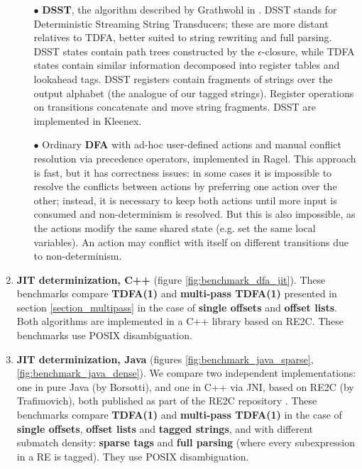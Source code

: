\documentclass[]{article}
\begin{document}
\begin{enumerate}
\begin{itemize}
\item[$\bullet$]
\textbf{DSST}, the algorithm described by Grathwohl in \cite{Gra15}.
DSST stands for Deterministic Streaming String Transducers; these are more distant relatives to TDFA,
better suited to string rewriting and full parsing.
DSST states contain path trees constructed by the $\epsilon$-closure,
while TDFA states contain similar information decomposed into register tables and lookahead tags.
DSST registers contain fragments of strings over the output alphabet (the analogue of our tagged strings).
Register operations on transitions concatenate and move string fragments.
DSST are implemented in Kleenex.
\medskip

\item[$\bullet$]
Ordinary \textbf{DFA} with ad-hoc user-defined actions
and manual conflict resolution via precedence operators,
implemented in Ragel.
This approach is fast, but it has correctness issues:
in some cases it is impossible to resolve the conflicts between actions by preferring one action over the other;
instead, it is necessary to keep both actions until more input is consumed and non-determinism is resolved.
But this is also impossible, as the actions modify the same shared state (e.g. set the same local variables).
An action may conflict with itself on different transitions due to non-determinism.
\medskip

\end{itemize}

\item
\textbf{JIT determinization, C++}
(figure \ref{fig:benchmark_dfa_jit}).
These benchmarks compare \textbf{TDFA(1)} and \textbf{multi-pass TDFA(1)} presented in section \ref{section_multipass}
in the case of \textbf{single offsets} and \textbf{offset lists}.
Both algorithms are implemented in a C++ library based on RE2C.
These benchmarks use POSIX disambiguation.
\medskip

\item
\textbf{JIT determinization, Java}
(figures \ref{fig:benchmark_java_sparse}, \ref{fig:benchmark_java_dense}).
We compare two independent implementations:
one in pure Java (by Borsotti),
and one in C++ via JNI, based on RE2C (by Trafimovich),
both published as part of the RE2C repository \cite{RE2CJava}.
These benchmarks compare \textbf{TDFA(1)} and \textbf{multi-pass TDFA(1)}
in the case of \textbf{single offsets}, \textbf{offset lists} and \textbf{tagged strings},
and with different submatch density: \textbf{sparse tags} and \textbf{full parsing}
(where every subexpression in a RE is tagged).
They use POSIX disambiguation.
\medskip

\end{enumerate}
\end{document}
